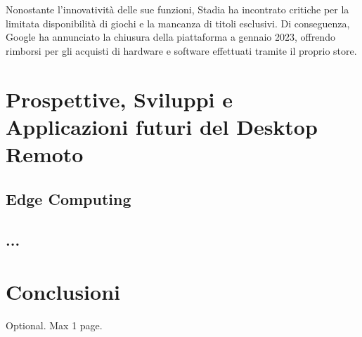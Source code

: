 \documentclass[12pt,a4paper,openright,twoside]{book}
\begin{document}
Nonostante l'innovatività delle sue funzioni, Stadia ha incontrato critiche per la limitata disponibilità di giochi e la mancanza di titoli esclusivi. Di conseguenza, Google ha annunciato la chiusura della piattaforma a gennaio 2023, offrendo rimborsi per gli acquisti di hardware e software effettuati tramite il proprio store.

\chapter{Prospettive, Sviluppi e Applicazioni futuri del Desktop Remoto}

\section{Edge Computing}

\section{...}

\chapter{Conclusioni}
\label{chap:conclusions}


\backmatter

\nocite{*} %


    

\begin{acknowledgements} %
Optional. Max 1 page.
\end{acknowledgements}
\end{document}

